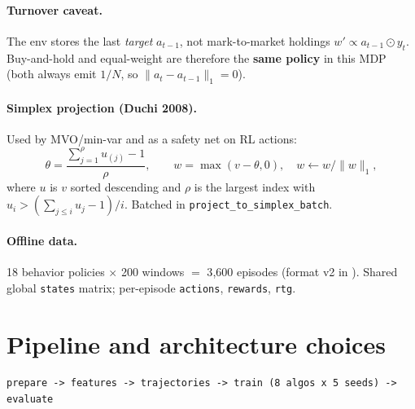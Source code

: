 \documentclass[11pt]{article}
\begin{document}
\paragraph{Turnover caveat.}
The env stores the last \emph{target} $a_{t-1}$, not mark-to-market holdings
$w'\propto a_{t-1}\odot y_t$. Buy-and-hold and equal-weight are therefore the
\textbf{same policy} in this MDP (both always emit $1/N$, so
$\|a_t-a_{t-1}\|_1=0$).

\paragraph{Simplex projection (Duchi 2008).}
Used by MVO/min-var and as a safety net on RL actions:
\begin{equation}
\theta=\frac{\sum_{j=1}^{\rho}u_{(j)}-1}{\rho},\qquad
w=\max(v-\theta,0),\quad w\leftarrow w/\|w\|_1,
\end{equation}
where $u$ is $v$ sorted descending and $\rho$ is the largest index with
$u_i > (\sum_{j\le i}u_j-1)/i$. Batched in \texttt{project\_to\_simplex\_batch}.

\paragraph{Offline data.}
18 behavior policies $\times$ 200 windows $=$ 3{,}600 episodes
(format v2 in ).
Shared global \texttt{states} matrix; per-episode \texttt{actions},
\texttt{rewards}, \texttt{rtg}.

\section{Pipeline and architecture choices}
\label{sec:pipeline}

\begin{lstlisting}
prepare -> features -> trajectories -> train (8 algos x 5 seeds) -> evaluate
\end{lstlisting}
\end{document}
